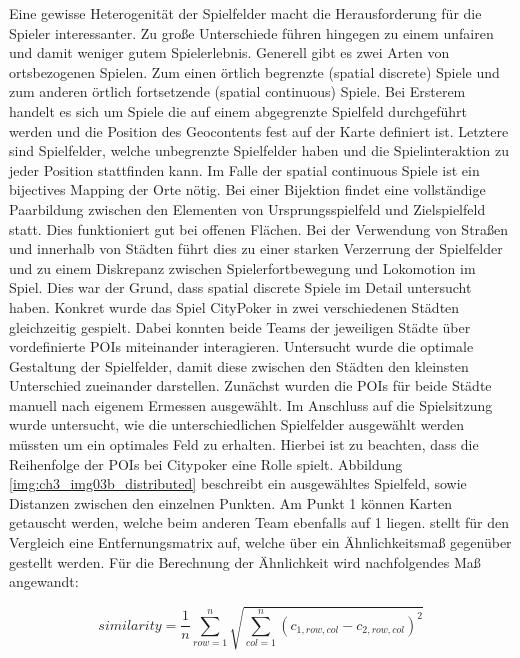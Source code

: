 Eine gewisse Heterogenität der Spielfelder macht die Herausforderung für die Spieler interessanter. Zu große Unterschiede führen hingegen zu einem unfairen und damit weniger gutem Spielerlebnis.
Generell gibt es zwei Arten von ortsbezogenen Spielen. Zum einen örtlich begrenzte (spatial discrete) Spiele und zum anderen örtlich fortsetzende (spatial
continuous) Spiele.
Bei Ersterem handelt es sich um Spiele die auf einem abgegrenzte Spielfeld durchgeführt werden und die Position des Geocontents fest auf der Karte definiert ist. Letztere sind Spielfelder, welche unbegrenzte Spielfelder haben und die Spielinteraktion zu jeder Position stattfinden kann.
Im Falle der spatial continuous Spiele ist ein bijectives Mapping der Orte nötig.
Bei einer Bijektion findet eine vollständige Paarbildung zwischen den Elementen von Ursprungsspielfeld und Zielspielfeld statt.\cite{Athanasiadis.1999}
Dies funktioniert gut bei offenen Flächen. Bei der Verwendung von Straßen und innerhalb von Städten führt dies zu einer starken Verzerrung der Spielfelder und zu einem Diskrepanz zwischen Spielerfortbewegung und Lokomotion im Spiel.
Dies war der Grund, dass \textcite{Kiefer.2005b} spatial discrete Spiele im Detail untersucht haben.
Konkret wurde das Spiel CityPoker\cite{Kiefer.2005b} in zwei verschiedenen Städten gleichzeitig gespielt. Dabei konnten beide Teams der jeweiligen Städte über vordefinierte POIs miteinander interagieren. Untersucht wurde die optimale Gestaltung der Spielfelder, damit diese zwischen den Städten den kleinsten Unterschied zueinander darstellen. Zunächst wurden die POIs für beide Städte manuell nach eigenem Ermessen ausgewählt. Im Anschluss auf die Spielsitzung wurde untersucht, wie die unterschiedlichen Spielfelder ausgewählt werden müssten um ein optimales Feld zu erhalten. Hierbei ist zu beachten, dass die Reihenfolge der POIs bei Citypoker eine Rolle spielt.
Abbildung \ref{img:ch3_img03b_distributed} beschreibt ein ausgewähltes Spielfeld, sowie Distanzen zwischen den einzelnen Punkten.
Am Punkt 1 können Karten getauscht werden, welche beim anderen Team ebenfalls auf 1 liegen. \cite{Kiefer.2007} stellt für den Vergleich eine Entfernungsmatrix auf, welche über ein Ähnlichkeitsmaß gegenüber gestellt werden.
Für die Berechnung der Ähnlichkeit wird nachfolgendes Maß angewandt:

\begin{equation}
similarity = \frac{1}{n} \sum_{row=1}^{n} \sqrt{ \sum_{col=1}^{n} (c_{1,row,col} - c_{2,row,col})^2 }
\end{equation}

